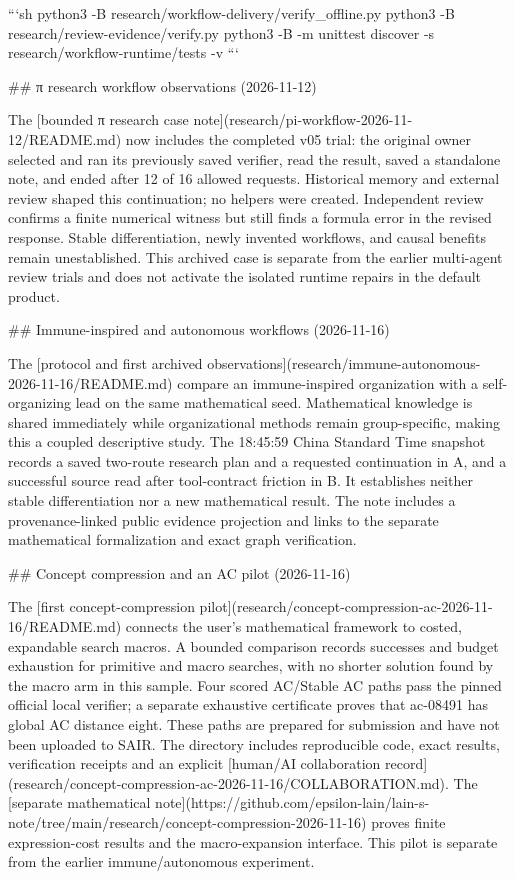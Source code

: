 ```sh
python3 -B research/workflow-delivery/verify_offline.py
python3 -B research/review-evidence/verify.py
python3 -B -m unittest discover -s research/workflow-runtime/tests -v
```

## π research workflow observations (2026-11-12)

The [bounded π research case note](research/pi-workflow-2026-11-12/README.md) now includes the completed v05 trial: the original owner selected and ran its previously saved verifier, read the result, saved a standalone note, and ended after 12 of 16 allowed requests. Historical memory and external review shaped this continuation; no helpers were created. Independent review confirms a finite numerical witness but still finds a formula error in the revised response. Stable differentiation, newly invented workflows, and causal benefits remain unestablished. This archived case is separate from the earlier multi-agent review trials and does not activate the isolated runtime repairs in the default product.

## Immune-inspired and autonomous workflows (2026-11-16)

The [protocol and first archived observations](research/immune-autonomous-2026-11-16/README.md) compare an immune-inspired organization with a self-organizing lead on the same mathematical seed. Mathematical knowledge is shared immediately while organizational methods remain group-specific, making this a coupled descriptive study. The 18:45:59 China Standard Time snapshot records a saved two-route research plan and a requested continuation in A, and a successful source read after tool-contract friction in B. It establishes neither stable differentiation nor a new mathematical result. The note includes a provenance-linked public evidence projection and links to the separate mathematical formalization and exact graph verification.

## Concept compression and an AC pilot (2026-11-16)

The [first concept-compression pilot](research/concept-compression-ac-2026-11-16/README.md) connects the user's mathematical framework to costed, expandable search macros. A bounded comparison records successes and budget exhaustion for primitive and macro searches, with no shorter solution found by the macro arm in this sample. Four scored AC/Stable AC paths pass the pinned official local verifier; a separate exhaustive certificate proves that ac-08491 has global AC distance eight. These paths are prepared for submission and have not been uploaded to SAIR. The directory includes reproducible code, exact results, verification receipts and an explicit [human/AI collaboration record](research/concept-compression-ac-2026-11-16/COLLABORATION.md). The [separate mathematical note](https://github.com/epsilon-lain/lain-s-note/tree/main/research/concept-compression-2026-11-16) proves finite expression-cost results and the macro-expansion interface. This pilot is separate from the earlier immune/autonomous experiment.

